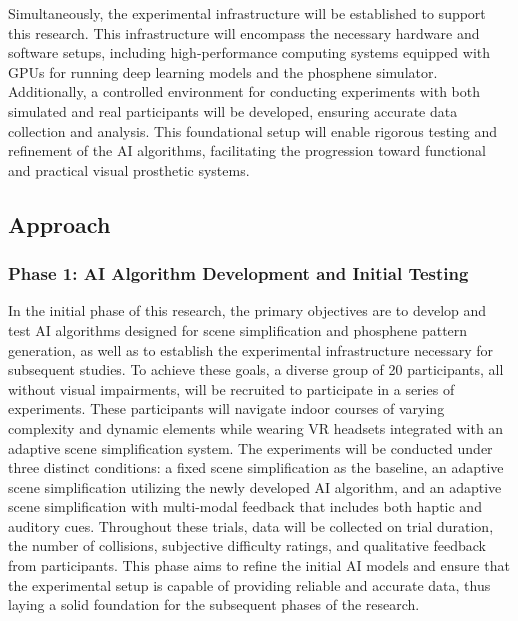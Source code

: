 \documentclass[10pt]{article}
\begin{document}
Simultaneously, the experimental infrastructure will be established to support
this research. This infrastructure will encompass the necessary hardware and
software setups, including high-performance computing systems equipped with GPUs
for running deep learning models and the phosphene simulator. Additionally, a
controlled environment for conducting experiments with both simulated and real
participants will be developed, ensuring accurate data collection and analysis.
This foundational setup will enable rigorous testing and refinement of the AI
algorithms, facilitating the progression toward functional and practical visual
prosthetic systems.

\subsection*{Approach}\label{subsec:approach}
\subsubsection*{Phase 1: AI Algorithm Development and Initial Testing}
In the initial phase of this research, the primary objectives are to develop and
test AI algorithms designed for scene simplification and phosphene pattern
generation, as well as to establish the experimental infrastructure necessary
for subsequent studies. To achieve these goals, a diverse group of 20
participants, all without visual impairments, will be recruited to participate
in a series of experiments. These participants will navigate indoor courses of
varying complexity and dynamic elements while wearing VR headsets integrated
with an adaptive scene simplification system. The experiments will be conducted
under three distinct conditions: a fixed scene simplification as the baseline,
an adaptive scene simplification utilizing the newly developed AI algorithm, and
an adaptive scene simplification with multi-modal feedback that includes both
haptic and auditory cues. Throughout these trials, data will be collected on
trial duration, the number of collisions, subjective difficulty ratings, and
qualitative feedback from participants. This phase aims to refine the initial AI
models and ensure that the experimental setup is capable of providing reliable
and accurate data, thus laying a solid foundation for the subsequent phases of
the research.
\end{document}
